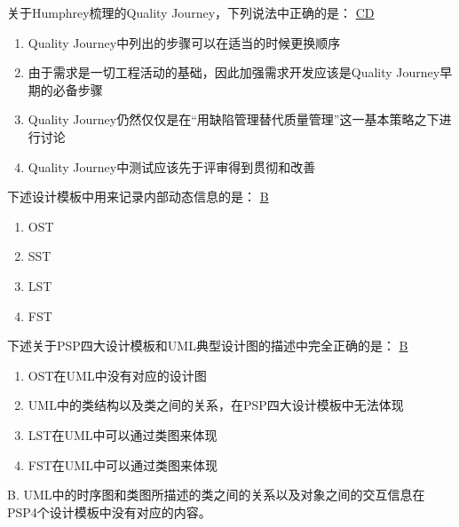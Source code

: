 \begin{problem}
	关于Humphrey梳理的Quality Journey，下列说法中正确的是： 
	\uline{CD}
        \begin{enumerate}[label=\Alph*.]
            \item Quality Journey中列出的步骤可以在适当的时候更换顺序
            \item 由于需求是一切工程活动的基础，因此加强需求开发应该是Quality Journey早期的必备步骤
            \item Quality Journey仍然仅仅是在“用缺陷管理替代质量管理”这一基本策略之下进行讨论
            \item Quality Journey中测试应该先于评审得到贯彻和改善
        \end{enumerate}
\end{problem}



\begin{problem}
	下述设计模板中用来记录内部动态信息的是：
	\uline{B}
    \vspace{-0.8em}
    \begin{multicols}{4}
        \begin{enumerate}[label=\Alph*.]
            \item OST
            \item SST
            \item LST
            \item FST
        \end{enumerate}
    \end{multicols}
    \vspace{-1em}
\end{problem}



\begin{problem}
	下述关于PSP四大设计模板和UML典型设计图的描述中完全正确的是： 
	\uline{B}
        \begin{enumerate}[label=\Alph*.]
            \item OST在UML中没有对应的设计图
            \item UML中的类结构以及类之间的关系，在PSP四大设计模板中无法体现
            \item LST在UML中可以通过类图来体现
            \item FST在UML中可以通过类图来体现
        \end{enumerate}
\end{problem}

\begin{solution}
B. UML中的时序图和类图所描述的类之间的关系以及对象之间的交互信息在PSP4个设计模板中没有对应的内容。
\end{solution}



